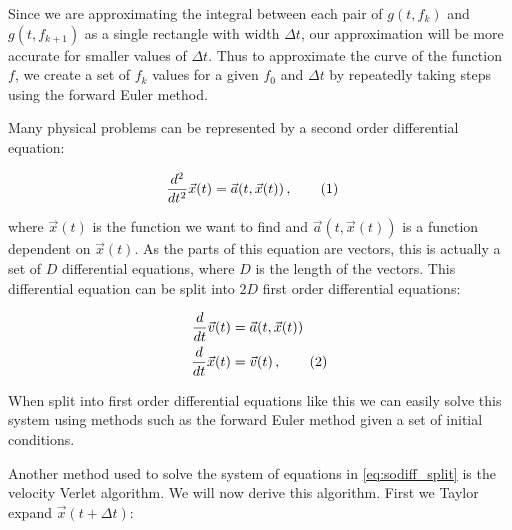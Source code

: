 \documentclass[reprint,english,notitlepage]{revtex4-1}  %
\newcommand\numberthis{\addtocounter{equation}{1}\tag{\theequation}}
\begin{document}
Since we are approximating the integral between each pair of \(g(t, f_{k})\) and \(g(t, f_{k+1})\)  as a single rectangle with width \(\Delta t\), our approximation will be more accurate for smaller values of \(\Delta t\). Thus to approximate the curve of the function \(f\), we create a set of \(f_{k}\) values for a given \(f_{0}\) and \(\Delta t\) by repeatedly taking steps using the forward Euler method.

Many physical problems can be represented by a second order differential equation:

\begin{align*}
\frac{d^2}{dt^2} \vec{x}(t) &= \vec{a}(t,\vec{x}(t)) \, , \numberthis \label{eq:sodiff}
\end{align*}

where $\vec{x}(t)$ is the function we want to find and $\vec{a}(t,\vec{x}(t))$ is a function dependent on $\vec{x}(t)$. As the parts of this equation are vectors, this is actually a set of $D$ differential equations, where $D$ is the length of the vectors. This differential equation can be split into $2D$ first order differential equations:

\begin{align*}
\frac{d}{dt} \vec{v}(t) &= \vec{a}(t,\vec{x}(t))  \\
\frac{d}{dt} \vec{x}(t) &= \vec{v}(t) \, , \numberthis \label{eq:sodiff_split}
\end{align*}

When split into first order differential equations like this we can easily solve this system using methods such as the forward Euler method given a set of initial conditions. 




Another method used to solve the system of equations in \eqref{eq:sodiff_split} is the velocity Verlet algorithm. We will now derive this algorithm. First we Taylor expand $\vec{x}(t + \Delta t)$:
\end{document}
